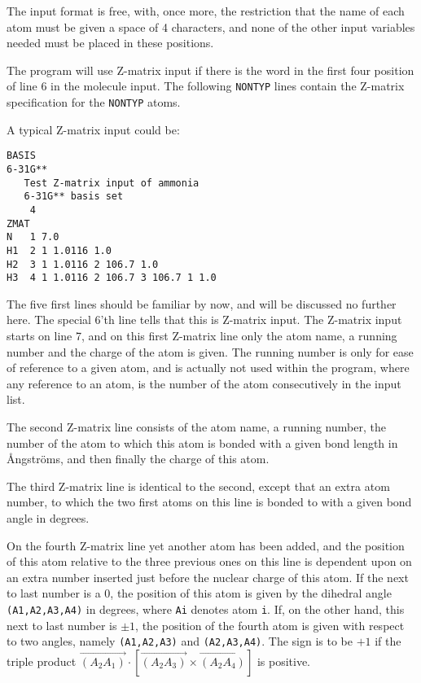 The input format is free, with, once more,
the restriction that the name of each atom must be given a space
of 4 characters, and none of the other input variables needed must be
placed in these positions.

The program will use Z-matrix input if there is
the word  
in the first four position of line 6 in the molecule input.
The following {\tt NONTYP} lines contain the Z-matrix specification
for the {\tt NONTYP} atoms.

A typical Z-matrix input could be:
\begin{verbatim}
BASIS
6-31G**
   Test Z-matrix input of ammonia
   6-31G** basis set
    4
ZMAT
N   1 7.0
H1  2 1 1.0116 1.0
H2  3 1 1.0116 2 106.7 1.0
H3  4 1 1.0116 2 106.7 3 106.7 1 1.0
\end{verbatim}
The five first lines should be familiar by now, and will be discussed
no further here. 
The special 6'th line tells that this is Z-matrix input.
The Z-matrix input starts on line 7, and on this first Z-matrix
line only the atom name, a running number and the charge of the
atom
is given. The running number is only for
ease of reference to a given atom, and is actually not used within the
program, where any reference to an atom, is the number of the
atom consecutively in the input list.

The second Z-matrix line consists of the atom name, a running number, the
number of the atom to which this atom is bonded with a given bond
length in {\AA}ngstr{\"o}ms, and then finally the charge of this atom.

The third Z-matrix line is identical to the second, except that an extra atom
number, to which the two first atoms on this line is bonded to with a
given bond angle in degrees.

On the fourth Z-matrix line yet another atom has been added, and the position
of this atom relative to the three previous ones on this line is
dependent upon on an extra number inserted just before the nuclear
charge of this atom. If the next to last number is a 0, the
position of this atom is given by the dihedral angle {\tt
(A1,A2,A3,A4)} in degrees, where {\tt Ai} denotes atom {\tt i}. If, on the other
hand, this next to last number is $\pm 1$, the position of the fourth
atom is given with respect to two angles, namely {\tt (A1,A2,A3)} and
{\tt (A2,A3,A4)}. The sign is to be $+ 1$ if the triple product
$\overrightarrow{\left(A_{2}A_{1}\right)}\cdot\left[\overrightarrow{\left(A_{2}A_{3}\right)}\times\overrightarrow{\left(A_{2}A_{4}\right)}\right]$
is positive.

